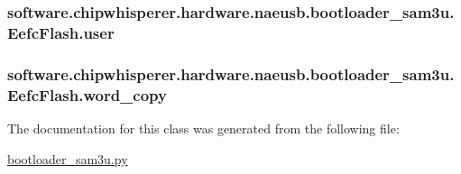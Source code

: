 \subsubsection[{user}]{\setlength{\rightskip}{0pt plus 5cm}software.\+chipwhisperer.\+hardware.\+naeusb.\+bootloader\+\_\+sam3u.\+Eefc\+Flash.\+user}\label{classsoftware_1_1chipwhisperer_1_1hardware_1_1naeusb_1_1bootloader__sam3u_1_1EefcFlash_a19e5f7148998350ce94f87032c47d145}
\hypertarget{classsoftware_1_1chipwhisperer_1_1hardware_1_1naeusb_1_1bootloader__sam3u_1_1EefcFlash_a62d4f1780180fd2272113360184ae994}{}
\subsubsection[{word\+\_\+copy}]{\setlength{\rightskip}{0pt plus 5cm}software.\+chipwhisperer.\+hardware.\+naeusb.\+bootloader\+\_\+sam3u.\+Eefc\+Flash.\+word\+\_\+copy}\label{classsoftware_1_1chipwhisperer_1_1hardware_1_1naeusb_1_1bootloader__sam3u_1_1EefcFlash_a62d4f1780180fd2272113360184ae994}


The documentation for this class was generated from the following file\+:\begin{DoxyCompactItemize}
\item 
\hyperlink{bootloader__sam3u_8py}{bootloader\+\_\+sam3u.\+py}\end{DoxyCompactItemize}
